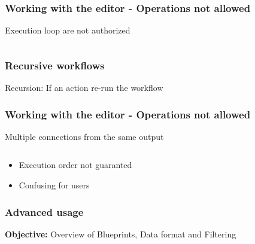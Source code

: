\begin{frame}
    \frametitle{Working with the editor - Operations not allowed}
    Execution loop are not authorized
    \vspace*{1em}
    \begin{columns}
        \begin{column}{0.7\textwidth}
        \end{column}
        \begin{column}{0.3\textwidth}
        \end{column}
    \end{columns}
\end{frame}

\begin{frame}
    \frametitle{Recursive workflows}
    \danger Recursion: If an action re-run the workflow
\end{frame}

\begin{frame}
    \frametitle{Working with the editor - Operations not allowed}
    Multiple connections from the same output
    \vspace*{1em}
    \begin{columns}
        \begin{column}{0.7\textwidth}
        \end{column}
        \begin{column}{0.3\textwidth}
        \end{column}
    \end{columns}
    \begin{itemize}
        \item Execution order not guaranted
        \item Confusing for users
    \end{itemize}
\end{frame}

\begin{frame}
    \frametitle{
        \huge
        Advanced usage
        \vspace{1em}
    }
    \textbf{Objective:} Overview of Blueprints, Data format and Filtering
\end{frame}

